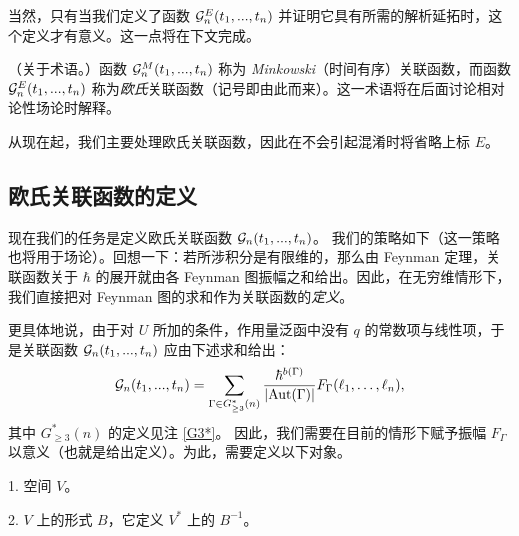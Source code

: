 当然，只有当我们定义了函数 $\mathcal{G}^E_n(t_1,...,t_n)$ 并证明它具有所需的解析延拓时，这个定义才有意义。这一点将在下文完成。

\begin{remark} （关于术语。）函数 $\mathcal{G}^M_n(t_1,...,t_n)$ 称为 \emph{Minkowski}（时间有序）关联函数，而函数
$\mathcal{G}^E_n(t_1,...,t_n)$ 称为\emph{欧氏}关联函数（记号即由此而来）。这一术语将在后面讨论相对论性场论时解释。

 从现在起，我们主要处理欧氏关联函数，因此在不会引起混淆时将省略上标 $E$。
\end{remark}


\subsection{欧氏关联函数的定义}

现在我们的任务是定义欧氏关联函数 $\mathcal{G}_n(t_1,...,t_n)$。
我们的策略如下（这一策略也将用于场论）。回想一下：若所涉积分是有限维的，那么由 Feynman 定理，关联函数关于 $\hbar$ 的展开就由各 Feynman 图振幅之和给出。因此，在无穷维情形下，我们直接把对 Feynman 图的求和作为关联函数的\emph{定义}。

更具体地说，由于对 $U$ 所加的条件，作用量泛函中没有 $q$ 的常数项与线性项，于是关联函数 $\mathcal{G}_n(t_1,...,t_n)$ 应由下述求和给出：
\begin{equation}\label{defcor}
\mathcal{G}_n(t_1,...,t_n)=
\sum_{\Gamma\in G_{\ge 3}^*(n)}\frac{\hbar^{b(\Gamma)}}{|{\rm Aut}(\Gamma)|}
F_\Gamma(\ell_1, \ldots ,\ell_n),
\end{equation}
其中 $G_{\ge 3}^*(n)$ 的定义见注 \ref{G3*}。
因此，我们需要在目前的情形下赋予振幅 $F_\Gamma$ 以意义（也就是给出定义）。为此，需要定义以下对象。

1. 空间 $V$。

2. $V$ 上的形式 $B$，它定义 $V^*$ 上的 $B^{-1}$。

